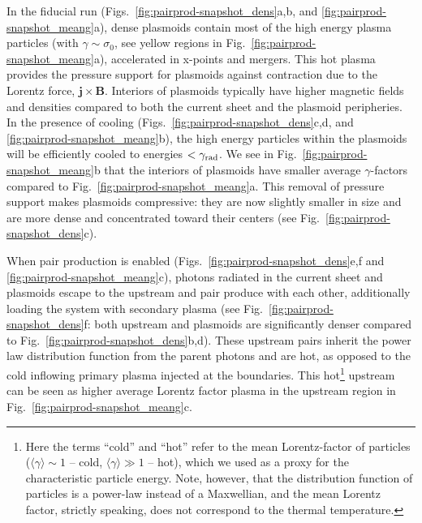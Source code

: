 In the fiducial run (Figs.~\ref{fig:pairprod-snapshot_dens}a,b, and \ref{fig:pairprod-snapshot_meang}a), dense plasmoids contain most of the high energy plasma particles (with $\gamma\sim \sigma_0$, see yellow regions in Fig.~\ref{fig:pairprod-snapshot_meang}a), accelerated in x-points and mergers. This hot plasma provides the pressure support for plasmoids against contraction due to the Lorentz force, $\bm{j}\times\bm{B}$. Interiors of plasmoids typically have higher magnetic fields and densities compared to both the current sheet and the plasmoid peripheries. In the presence of cooling (Figs.~\ref{fig:pairprod-snapshot_dens}c,d, and \ref{fig:pairprod-snapshot_meang}b), the high energy particles within the plasmoids will be efficiently cooled to energies $<\gamma_{\rm rad}$. We see in Fig.~\ref{fig:pairprod-snapshot_meang}b that the interiors of plasmoids have smaller average $\gamma$-factors compared to Fig.~\ref{fig:pairprod-snapshot_meang}a. This removal of pressure support makes plasmoids compressive: they are now slightly smaller in size and are more dense and concentrated toward their centers (see Fig.~\ref{fig:pairprod-snapshot_dens}c).

When pair production is enabled (Figs.~\ref{fig:pairprod-snapshot_dens}e,f and \ref{fig:pairprod-snapshot_meang}c), photons radiated in the current sheet and plasmoids escape to the upstream and pair produce with each other, additionally loading the system with secondary plasma (see Fig.~\ref{fig:pairprod-snapshot_dens}f: both upstream and plasmoids are significantly denser compared to Fig.~\ref{fig:pairprod-snapshot_dens}b,d). These upstream pairs inherit the power law distribution function from the parent photons and are hot, as opposed to the cold inflowing primary plasma injected at the boundaries. This hot\footnote{Here the terms ``cold'' and ``hot'' refer to the mean Lorentz-factor of particles ($\langle\gamma\rangle\sim 1$ -- cold, $\langle\gamma\rangle\gg 1$ -- hot), which we used as a proxy for the characteristic particle energy. Note, however, that the distribution function of particles is a power-law instead of a Maxwellian, and the mean Lorentz factor, strictly speaking, does not correspond to the thermal temperature.} upstream can be seen as higher average Lorentz factor plasma in the upstream region in Fig.~\ref{fig:pairprod-snapshot_meang}c.

